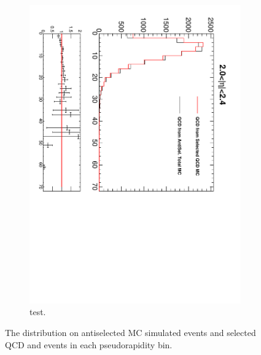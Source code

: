 \begin{figure}[htbp]
\begin{subfigure}{0.45\textwidth}
    \includegraphics*[trim = 0mm 0mm 15mm 0mm, clip, width=\textwidth, angle=90]{MetCompare_anti_eta6.pdf}
    \caption{test.}
    \label{fig:qcd_met_eta6}
  \end{subfigure}
  \caption{The \ETm distribution on antiselected \ac{MC} simulated events and selected \ac{QCD} and \gjet events in each pseudorapidity bin.}
  \label{asym36:antiselclosure}
\end{figure}

